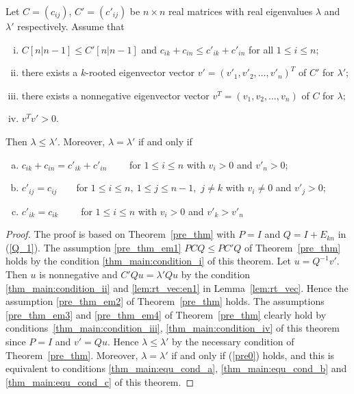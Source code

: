 \documentclass{beamer}
\begin{document}
\begin{frame}
    \begin{theorem}\label{thm_main}
        Let $C=(c_{ij})$, $C'=(c'_{ij})$ be  $n\times n$ real matrices with real eigenvalues $\lambda$ and $\lambda'$ respectively.
    Assume that
        \begin{enumerate}[(i)]
        \item \label{thm_main:condition_i} $C[n|n-1]\leq C'[n|n-1]$ and $c_{ik}+c_{in}\leq c'_{ik}+c'_{in}$ for all $1\leq i\leq n$;
        \item \label{thm_main:condition_ii} there exists a $k$-rooted eigenvector vector $v'=(v'_1, v'_2, \ldots, v'_n)^T$ of $C'$ for $\lambda'$;
        \item \label{thm_main:condition_iii}there exists a nonnegative eigenvector vector $v^T=(v_1, v_2, \ldots, v_n)$ of $C$ for $\lambda$;
        \item \label{thm_main:condition_iv}$v^Tv'>0.$
        \end{enumerate}
        
        Then $\lambda\leq \lambda'$.
        Moreover, $\lambda=\lambda'$
        if and only if
        \begin{enumerate}[(a)]
            \item \label{thm_main:equ_cond_a} $c_{ik}+c_{in}=c'_{ik}+c'_{in} \qquad$  for $1\leq i\leq n$ with $v_i>0$ and $v'_n>0;$
            \item \label{thm_main:equ_cond_b} $c'_{ij}=c_{ij}\qquad $for $1\leq i\leq n,~1\leq j\leq n-1,$ $j \neq k$ with $v_i\ne 0 $ and $v'_j>0$;
            \item \label{thm_main:equ_cond_c} $c'_{ik}=c_{ik} \qquad $  for $1\leq i \leq n$ with  $v_i>0$ and $ v'_{k}>v'_n$
        \end{enumerate} 
    \end{theorem}
\end{frame}

\begin{frame}
    \begin{proof}
        The proof is based on Theorem~\ref{pre_thm} with $P = I$ and $Q = I + E_{kn}$ in (\ref{Q_1}).
        The assumption \ref{pre_thm_em1} $PCQ\leq PC'Q$ of Theorem~\ref{pre_thm} holds by the condition \ref{thm_main:condition_i} of this theorem.
        Let $u = Q^{-1}v'$. Then $u$ is nonnegative and $C'Qu = \lambda' Qu$ by the condition \ref{thm_main:condition_ii} and \ref{lem:rt_vec:en1} in
         Lemma~\ref{lem:rt_vec}. Hence the assumption \ref{pre_thm_em2} of Theorem~\ref{pre_thm} holds. The assumptions \ref{pre_thm_em3} and \ref{pre_thm_em4}
          of Theorem~\ref{pre_thm} clearly hold by conditions~\ref{thm_main:condition_iii}, \ref{thm_main:condition_iv} of this theorem since $P = I$ and
           $v'= Qu$. Hence $\lambda \leq \lambda' $ by the necessary condition of Theorem~\ref{pre_thm}. Moreover,
            $\lambda = \lambda'$ if and only if (\ref{pre0}) holds, and this is equivalent to
             conditions \ref{thm_main:equ_cond_a}, \ref{thm_main:equ_cond_b} and \ref{thm_main:equ_cond_c} of this theorem.
    \end{proof}
\end{frame}
\end{document}
